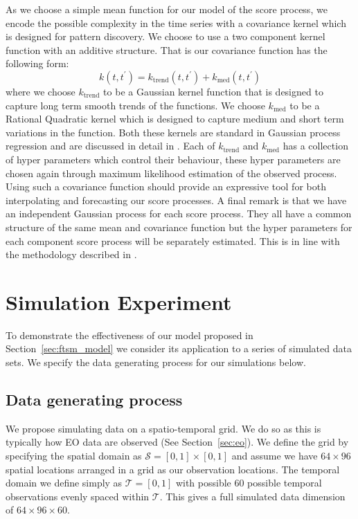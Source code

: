 As we choose a simple mean function for our model of the score process, we encode the possible complexity in the time series with a covariance kernel which is designed for pattern discovery. 
We choose to use a two component kernel function with an additive structure. 
That is our covariance function has the following form:
\begin{equation}
	k(t, t^\prime) = k_\text{trend}(t, t^\prime) + k_\text{med}(t, t^\prime)
\end{equation}
where we choose $k_{\text{trend}}$ to be a Gaussian kernel function that is designed to capture long term smooth trends of the functions.
We choose $k_{\text{med}}$ to be a Rational Quadratic kernel which is designed to capture medium and short term variations in the function.
Both these kernels are standard in Gaussian process regression and are discussed in detail in \citep{williams_gaussian_2006}. 
Each of $k_{\text{trend}}$ and $k_{\text{med}}$ has a collection of hyper parameters which control their behaviour, these hyper parameters are chosen again through maximum likelihood estimation of the observed process.
Using such a covariance function should provide an expressive tool for both interpolating and forecasting our score processes.
A final remark is that we have an independent Gaussian process for each score process.
They all have a common structure of the same mean and covariance function but the hyper parameters for each component score process will be separately estimated.
This is in line with the methodology described in \citep{hyndman_forecasting_2009}. 

\section{Simulation Experiment \label{sec:ftsm_sim}}
To demonstrate the effectiveness of our model proposed in Section~\ref{sec:ftsm_model} we consider its application to a series of simulated data sets.
We specify the data generating process for our simulations below. 

\subsection{Data generating process \label{ftsm_sim_dgp}}
We propose simulating data on a spatio-temporal grid.
We do so as this is typically how EO data are observed (See Section~\ref{sec:eo}).
We define the grid by specifying the spatial domain as $\mathcal{S} = \left[0, 1\right] \times \left[0, 1\right]$ and assume we have $64 \times 96$ spatial locations arranged in a grid as our observation locations.
The temporal domain we define simply as $\mathcal{T} = \left[0, 1\right]$ with possible $60$ possible temporal observations evenly spaced within $\mathcal{T}$. 
This gives a full simulated data dimension of $64 \times 96 \times 60$. 

